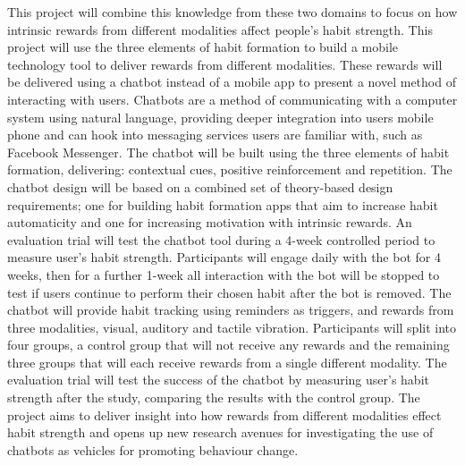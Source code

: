 This project will combine this knowledge from these two domains to focus on how intrinsic rewards from different modalities affect people's habit strength.\newline
\newline
This project will use the three elements of habit formation to build a mobile technology tool to deliver rewards from different modalities.
These rewards will be delivered using a chatbot instead of a mobile app to present a novel method of interacting with users.
Chatbots are a method of communicating with a computer system using natural language, providing deeper integration into users mobile phone and
can hook into messaging services users are familiar with, such as Facebook Messenger.
The chatbot will be built using the three elements of habit formation, delivering: contextual cues, positive reinforcement and repetition.
The chatbot design will be based on a combined set of theory-based design requirements;
one for building habit formation apps that aim to increase habit automaticity and one for increasing motivation with intrinsic rewards.\newline
\newline
An evaluation trial will test the chatbot tool during a 4-week controlled period to measure user's habit strength.
Participants will engage daily with the bot for 4 weeks, then for a further 1-week all interaction with the bot will be stopped to test
if users continue to perform their chosen habit after the bot is removed.
The chatbot will provide habit tracking using reminders as triggers, and rewards from three modalities, visual, auditory and tactile vibration.
Participants will split into four groups, a control group that will not receive any rewards and the remaining three groups that will each receive rewards from a single different modality.
The evaluation trial will test the success of the chatbot by measuring user's habit strength after the study, comparing the results with the control group.\newline
\newline
The project aims to deliver insight into how rewards from different modalities effect habit strength and opens up new research avenues for investigating the use of chatbots as
vehicles for promoting behaviour change.

